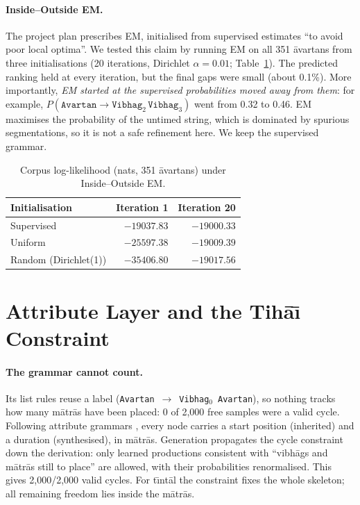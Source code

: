 \documentclass[11pt]{article}
\newcommand{\matra}{m\=atr\=a}
\newcommand{\avartan}{\=avartan}
\newcommand{\Tihai}{Tih\=a\={\i}}
\begin{document}
\paragraph{Inside--Outside EM.} The project plan prescribes EM, initialised
from supervised estimates ``to avoid poor local optima''. We tested this
claim by running EM on all 351 \avartan{}s from three initialisations (20
iterations, Dirichlet $\alpha{=}0.01$; Table~\ref{tab:em}). The predicted
ranking held at every iteration, but the final gaps were small (about 0.1\%).
More importantly, \emph{EM started at the supervised probabilities moved away
from them}: for example, $P(\texttt{Avartan}\to\texttt{Vibhag}_2\,\texttt{Vibhag}_3)$
went from 0.32 to 0.46. EM maximises the probability of the untimed string,
which is dominated by spurious segmentations, so it is not a safe refinement
here. We keep the supervised grammar.

\begin{table}[t]
\centering\small
\begin{tabular}{lrr}
\toprule
Initialisation & Iteration 1 & Iteration 20 \\
\midrule
Supervised & $-19037.83$ & $\mathbf{-19000.33}$ \\
Uniform & $-25597.38$ & $-19009.39$ \\
Random (Dirichlet(1)) & $-35406.80$ & $-19017.56$ \\
\bottomrule
\end{tabular}
\caption{Corpus log-likelihood (nats, 351 \avartan{}s) under Inside--Outside EM.}
\label{tab:em}
\end{table}

\section{Attribute Layer and the \Tihai{} Constraint}
\label{sec:attr}

\paragraph{The grammar cannot count.} Its list rules reuse a label
(\texttt{Avartan}~$\to$~\texttt{Vibhag}$_0$~\texttt{Avartan}), so nothing
tracks how many \matra{}s have been placed: 0 of 2{,}000 free samples were a
valid cycle. Following attribute grammars \citep{knuth1968semantics}, every
node carries a start position (inherited) and a duration (synthesised), in
\matra{}s. Generation propagates the cycle constraint down the derivation:
only learned productions consistent with ``vibh\=ags and \matra{}s still to
place'' are allowed, with their probabilities renormalised. This gives
2{,}000/2{,}000 valid cycles. For t\={\i}nt\=al the constraint fixes the whole
skeleton; all remaining freedom lies inside the \matra{}s.
\end{document}
